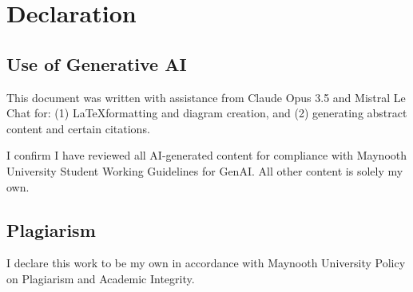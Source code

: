 \section*{Declaration}
\subsection*{Use of Generative AI}
This document was written with assistance from Claude Opus 3.5 and Mistral Le Chat for: (1) \LaTeX\space formatting and diagram creation, and (2) generating abstract content and certain \BibTeX\space citations.

I confirm I have reviewed all AI-generated content for compliance with Maynooth University Student Working Guidelines for GenAI. All other content is solely my own.
\subsection*{Plagiarism}
I declare this work to be my own in accordance with Maynooth University Policy on Plagiarism and Academic Integrity.